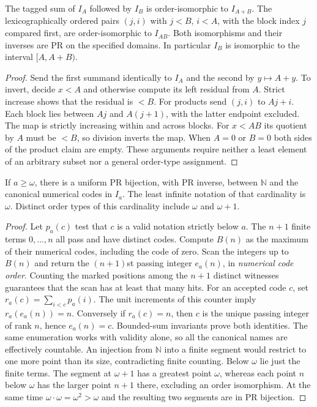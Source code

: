 \begin{corollary}
The tagged sum of $I_A$ followed by $I_B$ is order-isomorphic to $I_{A+B}$. The lexicographically ordered pairs $(j,i)$ with $j<B$, $i<A$, with the block index $j$ compared first, are order-isomorphic to $I_{AB}$. Both isomorphisms and their inverses are PR on the specified domains. In particular $I_B$ is isomorphic to the interval $[A,A+B)$.
\end{corollary}
\begin{proof}
Send the first summand identically to $I_A$ and the second by $y\mapsto A+y$. To invert, decide $x<A$ and otherwise compute its left residual from $A$. Strict increase shows that the residual is $<B$. For products send $(j,i)$ to $Aj+i$. Each block lies between $Aj$ and $A(j+1)$, with the latter endpoint excluded. The map is strictly increasing within and across blocks. For $x<AB$ its quotient by $A$ must be $<B$, so division inverts the map. When $A=0$ or $B=0$ both sides of the product claim are empty. These arguments require neither a least element of an arbitrary subset nor a general order-type assignment.
\end{proof}

\begin{theorem}
If $a\ge\omega$, there is a uniform PR bijection, with PR inverse, between $\mathbb N$ and the canonical numerical codes in $I_a$. The least infinite notation of that cardinality is $\omega$. Distinct order types of this cardinality include $\omega$ and $\omega+1$.
\end{theorem}
\begin{proof}
Let $p_a(c)$ test that $c$ is a valid notation strictly below $a$. The $n+1$ finite terms $0,\ldots,n$ all pass and have distinct codes. Compute $B(n)$ as the maximum of their numerical codes, including the code of zero. Scan the integers up to $B(n)$ and return the $(n+1)$st passing integer $e_a(n)$, in \emph{numerical code order}. Counting the marked positions among the $n+1$ distinct witnesses guarantees that the scan has at least that many hits. For an accepted code $c$, set $r_a(c)=\sum_{i<c}p_a(i)$. The unit increments of this counter imply $r_a(e_a(n))=n$. Conversely if $r_a(c)=n$, then $c$ is the unique passing integer of rank $n$, hence $e_a(n)=c$. Bounded-sum invariants prove both identities. The same enumeration works with validity alone, so all the canonical names are effectively countable. An injection from $\mathbb N$ into a finite segment would restrict to one more point than its size, contradicting finite counting. Below $\omega$ lie just the finite terms. The segment at $\omega+1$ has a greatest point $\omega$, whereas each point $n$ below $\omega$ has the larger point $n+1$ there, excluding an order isomorphism. At the same time $\omega\cdot\omega=\omega^2>\omega$ and the resulting two segments are in PR bijection.
\end{proof}
